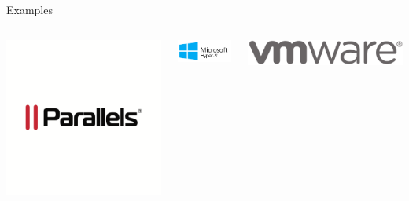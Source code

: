 \documentclass[11pt]{beamer}
\begin{document}
\begin{frame}{Examples}
  \begin{columns}
    \begin{column}{0.33\linewidth}
      \begin{center}
        \includegraphics[width=0.8\linewidth]{parallels}
      \end{center}
    \end{column}
    \begin{column}{0.33\linewidth}
      \includegraphics[width=\linewidth]{hyperv}
    \end{column}
    \begin{column}{0.33\linewidth}
      \includegraphics[width=\linewidth]{vmware}
    \end{column}

\end{columns}
\end{frame}
\end{document}
